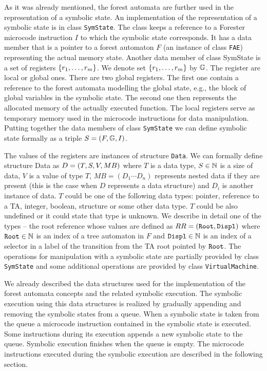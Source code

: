 As it was already mentioned, the forest automata are further used in the representation of a symbolic state.
An implementation of the representation of a symbolic state is in class {\tt SymState}.
The class keeps a reference to a Forester microcode instruction $I$ to which the symbolic state corresponds.
It has a data member that is a pointer to a forest automaton $F$ (an instance of class {\tt FAE})
representing the actual memory state.
Another data member of class SymState is a set of registers $\{r_1, \ldots, r_m\}$.
We denote set $\{r_1, \ldots, r_m\}$ by $\mathbb{G}$. 
The register are local or global ones.
There are two global registers.
The first one contain a reference to the forest automata modelling
the global state, e.g., the block of global variables in the symbolic state.
The second one then represents the allocated memory of the actually executed function.
The local registers serve as temporary memory used in
the microcode instructions for data manipulation.
Putting together the data members of class {\tt SymState}
we can define symbolic state formally as a triple $S=(F, \mathbb{G}, I)$.

The values of the registers are instances of structure {\tt Data}.
We can formally define structure Data as $D = (T,S,V,MB)$ where
$T$ is a data type,
$S \in \mathbb{N}$ is a size of data,
$V$ is a value of type $T$,
$MB=(D_1 \cdots D_n)$ represents nested data if they are present (this is the case when $D$ represents a data structure)
and $D_i$ is another instance of data.
$T$ could be one of the following data types: pointer, reference to a TA, integer, boolean, structure or some other data type.
$T$ could be also undefined or it could state that type is unknown.
We describe in detail one of the types -- the root reference
whose values are defined as $RR=({\tt Root},{\tt Displ})$
where ${\tt Root} \in \mathbb{N}$ is an index of a tree automaton in $F$
and ${\tt Displ} \in \mathbb{N}$ is an index of a selector in a label of
the transition from the TA root pointed by ${\tt Root}$.
The operations for manipulation with a symbolic state are partially provided by class {\tt SymState}
and some additional operations are provided by class {\tt VirtualMachine}.

We already described the data structures used for the implementation of the forest automata concepts
and the related symbolic execution.
The symbolic execution using this data structures is realized by gradually appending
and removing the symbolic states from a queue.
When a symbolic state is taken from the queue a microcode instruction contained in
the symbolic state is executed.
Some instructions during its execution appends a new symbolic state to the queue.
Symbolic execution finishes when the queue is empty.
The microcode instructions executed during the symbolic execution are described in the following section.

